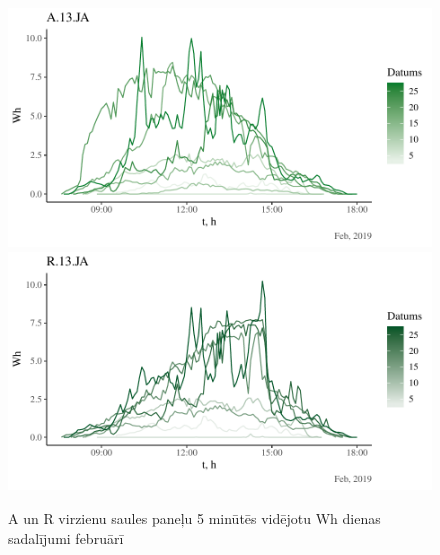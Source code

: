 \begin{figure}[h]
    \centering
    \includegraphics[width=\linewidth]{figures/sol_day/feb_A13JA.pdf}
    \includegraphics[width=\linewidth]{figures/sol_day/feb_R13JA.pdf}
    \caption{A un R virzienu saules paneļu 5 minūtēs vidējotu Wh dienas sadalījumi februārī}
    \label{fig:feb_ar}
\end{figure}

